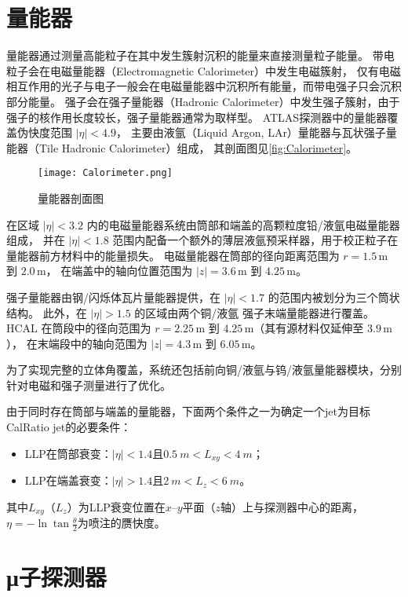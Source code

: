 \section{量能器}
量能器通过测量高能粒子在其中发生簇射沉积的能量来直接测量粒子能量。
带电粒子会在电磁量能器（Electromagnetic Calorimeter）中发生电磁簇射，
仅有电磁相互作用的光子与电子一般会在电磁量能器中沉积所有能量，而带电强子只会沉积部分能量。
强子会在强子量能器（Hadronic Calorimeter）中发生强子簇射，由于强子的核作用长度较长，强子量能器通常为取样型。
ATLAS探测器中的量能器覆盖伪快度范围 \( |\eta| < 4.9 \)，
主要由液氩（Liquid Argon, LAr）量能器与瓦状强子量能器（Tile Hadronic Calorimeter）组成，
其剖面图见\autoref{fig:Calorimeter}。

\begin{figure}[ht]
    \centering
    \texttt{[image: Calorimeter.png]}
    \caption{量能器剖面图}
    \label{fig:Calorimeter}
\end{figure}

在区域 \( |\eta| < 3.2 \) 内的电磁量能器系统由筒部和端盖的高颗粒度铅/液氩电磁量能器组成，
并在 \( |\eta| < 1.8 \) 范围内配备一个额外的薄层液氩预采样器，用于校正粒子在量能器前方材料中的能量损失。
电磁量能器在筒部的径向距离范围为 \( r = 1.5\,\text{m} \) 到 \( 2.0\,\text{m} \)，
在端盖中的轴向位置范围为 \( |z| = 3.6\,\text{m} \) 到 \( 4.25\,\text{m} \)。

强子量能器由钢/闪烁体瓦片量能器提供，在 \( |\eta| < 1.7 \) 的范围内被划分为三个筒状结构。
此外，在 \( |\eta| > 1.5 \) 的区域由两个铜/液氩 强子末端量能器进行覆盖。
HCAL 在筒段中的径向范围为 \( r = 2.25\,\text{m} \) 到 \( 4.25\,\text{m} \)（其有源材料仅延伸至 \( 3.9\,\text{m} \)），
在末端段中的轴向范围为 \( |z| = 4.3\,\text{m} \) 到 \( 6.05\,\text{m} \)。

为了实现完整的立体角覆盖，系统还包括前向铜/液氩与钨/液氩量能器模块，分别针对电磁和强子测量进行了优化。


由于同时存在筒部与端盖的量能器，下面两个条件之一为确定一个jet为目标CalRatio jet的必要条件：
\begin{itemize}
    \item LLP在筒部衰变：$|\eta|<1.4$且$\SI{0.5}{m}<L_{xy}<\SI{4}{m}$；
    \item LLP在端盖衰变：$|\eta|>1.4$且$\SI{2}{m}<L_{z}<\SI{6}{m}$。
\end{itemize}
其中$L_{xy}$（$L_{z}$）为LLP衰变位置在$x$--$y$平面（$z$轴）上与探测器中心的距离，
$\eta=-\ln \tan \frac{\theta}{2}$为喷注的赝快度。

\section{μ子探测器}
